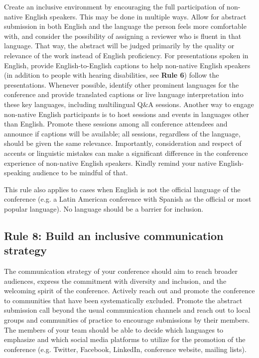 \documentclass[10pt,letterpaper]{article}
\begin{document}
Create an inclusive environment by encouraging the full participation of non-native English speakers. This may be done in multiple ways.
Allow for abstract submission in both English and the language the person feels more comfortable with, and consider the possibility of assigning a reviewer who is fluent in that language. That way, the abstract will be judged primarily by the quality or relevance of the work instead of English proficiency.
For presentations spoken in English, provide English-to-English captions to help non-native English speakers (in addition to people with hearing disabilities, see \textbf{Rule 6}) follow the presentations. 
Whenever possible, identify other prominent languages for the conference and provide translated captions or live language interpretation into these key languages, including multilingual Q\&A sessions.
Another way to engage non-native English participants is to host sessions and events in languages other than English. 
Promote these sessions among all conference attendees and announce if captions will be available; all sessions, regardless of the language, should be given the same relevance.
Importantly, consideration and respect of accents or linguistic mistakes can make a significant difference in the conference experience of non-native English speakers. Kindly remind your native English-speaking audience to be mindful of that.

This rule also applies to cases when English is not the official language of the conference (e.g. a Latin American conference with Spanish as the official or most popular language). No language should be a barrier for inclusion. 



\subsection*{Rule 8: Build an inclusive communication strategy}
\label{rule_communication}

The communication strategy of your conference should aim to reach broader audiences, express the commitment with diversity and inclusion, and the welcoming spirit of the conference.
Actively reach out and promote the conference to communities that have been systematically excluded. 
Promote the abstract submission call beyond the usual communication channels and reach out to local groups and communities of practice to encourage submissions by their members.
The members of your team should be able to decide which languages to emphasize and which social media platforms to utilize for the promotion of the conference (e.g. Twitter, Facebook, LinkedIn, conference website, mailing lists).%
\end{document}
